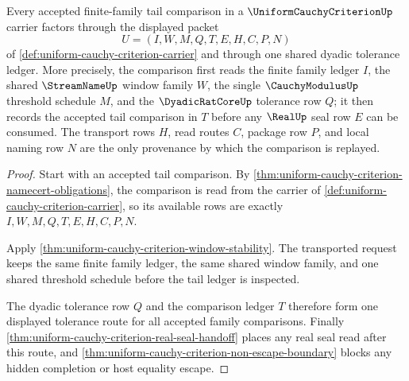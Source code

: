 \begin{theorem}
\label{thm:uniform-cauchy-criterion-tail-ledger-exactness}
Every accepted finite-family tail comparison in a $\UniformCauchyCriterionUp$
carrier factors through the displayed packet
$$
U=(I,W,M,Q,T,E,H,C,P,N)
$$
of \autoref{def:uniform-cauchy-criterion-carrier} and through one shared
dyadic tolerance ledger. More precisely, the comparison first reads the finite
family ledger $I$, the shared $\StreamNameUp$ window family $W$, the single
$\CauchyModulusUp$ threshold schedule $M$, and the $\DyadicRatCoreUp$
tolerance row $Q$; it then records the accepted tail comparison in $T$ before
any $\RealUp$ seal row $E$ can be consumed. The transport rows $H$, read routes
$C$, package row $P$, and local naming row $N$ are the only provenance by which
the comparison is replayed.
\end{theorem}
\begin{proof}
Start with an accepted tail comparison. By
\autoref{thm:uniform-cauchy-criterion-namecert-obligations}, the comparison is
read from the carrier of \autoref{def:uniform-cauchy-criterion-carrier}, so its
available rows are exactly $I,W,M,Q,T,E,H,C,P,N$.

Apply \autoref{thm:uniform-cauchy-criterion-window-stability}. The transported
request keeps the same finite family ledger, the same shared window family,
and one shared threshold schedule before the tail ledger is inspected.

The dyadic tolerance row $Q$ and the comparison ledger $T$ therefore form one
displayed tolerance route for all accepted family comparisons. Finally
\autoref{thm:uniform-cauchy-criterion-real-seal-handoff} places any real seal
read after this route, and
\autoref{thm:uniform-cauchy-criterion-non-escape-boundary} blocks any hidden
completion or host equality escape.
\end{proof}

